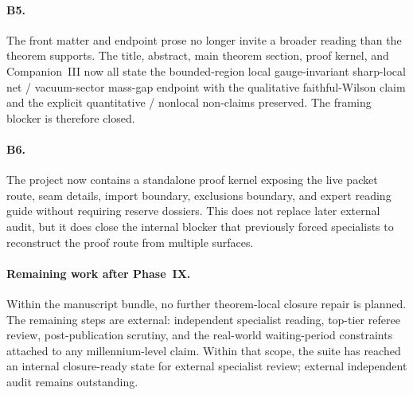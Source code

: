 \paragraph{B5.}
The front matter and endpoint prose no longer invite a broader reading than the theorem supports. The title, abstract, main theorem section, proof kernel, and Companion~III now all state the bounded-region local gauge-invariant sharp-local net / vacuum-sector mass-gap endpoint with the qualitative faithful-Wilson claim and the explicit quantitative / nonlocal non-claims preserved. The framing blocker is therefore closed.

\paragraph{B6.}
The project now contains a standalone proof kernel exposing the live packet route, seam details, import boundary, exclusions boundary, and expert reading guide without requiring reserve dossiers. This does not replace later external audit, but it does close the internal blocker that previously forced specialists to reconstruct the proof route from multiple surfaces.

\paragraph{Remaining work after Phase~IX.}
Within the manuscript bundle, no further theorem-local closure repair is planned. The remaining steps are external: independent specialist reading, top-tier referee review, post-publication scrutiny, and the real-world waiting-period constraints attached to any millennium-level claim. Within that scope, the suite has reached an internal closure-ready state for external specialist review; external independent audit remains outstanding.
